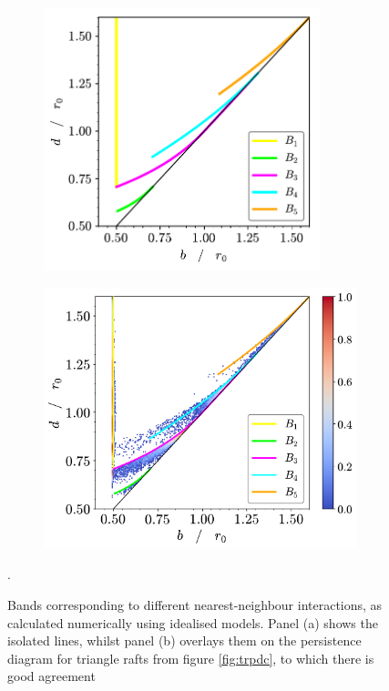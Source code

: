 \begin{figure}[tb]
	\centering
     
     \begin{subfigure}[b]{0.48\textwidth}
         \centering
         \includegraphics[width=0.88\textwidth]{./figures/ph/blines.pdf}
         \caption{}
         \label{fig:blinesa}
     \end{subfigure}
     \hfill
      \begin{subfigure}[b]{0.48\textwidth}
         \centering
         \includegraphics[width=\textwidth]{./figures/ph/blines_overlay.pdf}
         \caption{}
         \label{fig:blinesb}
     \end{subfigure}
 
	\caption{Bands corresponding to different nearest\--neighbour interactions, as calculated numerically using idealised models. Panel (a) shows the isolated lines, whilst panel (b) overlays them on the persistence diagram for triangle rafts from figure \ref{fig:trpdc}, to which there is good agreement}.
	\label{fig:blines}
\end{figure}

